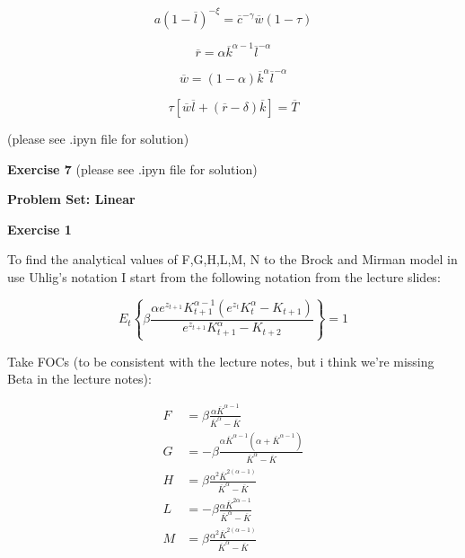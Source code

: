 \documentclass[letterpaper,12pt]{article}
\theoremstyle{definition}
\begin{document}
\begin{equation}
  a(1-\overline{l})^{-\xi}=\overline{c}^{-\gamma}\overline{w}(1-\tau)
\end{equation}

\begin{equation}
  \overline{r}=\alpha \overline{k}^{\alpha-1}\overline{l}^{-\alpha}
\end{equation}

\begin{equation}
  \overline{w}=(1-\alpha) \overline{k}^{\alpha} \overline{l}^{-\alpha}
\end{equation}

\begin{equation}
  \tau[\overline{w}\overline{l}+(\overline{r}-\delta) \overline{k}]=\overline{T}
\end{equation}

(please see .ipyn file for solution)

\vspace{5mm}

\noindent\textbf{Exercise 7}
(please see .ipyn file for solution)

 \newpage

\begin{flushleft}
  \textbf{\large{Problem Set: Linear}} \\
\end{flushleft}

\vspace{5mm}

\noindent\textbf{Exercise 1}

To find the analytical values of F,G,H,L,M, N to the Brock and Mirman model in use Uhlig’s notation I start from the following notation from the lecture slides:

\begin{equation}
  E_{t}\left\{\beta \frac{\alpha e^{z_{t+1}} K_{t+1}^{\alpha-1}\left(e^{z_{t}} K_{t}^{\alpha}-K_{t+1}\right)}{e^{z_{t+1}} K_{t+1}^{\alpha}-K_{t+2}}\right\}=1
\end{equation}

Take FOCs (to be consistent with the lecture notes, but i think we're missing Beta in the lecture notes):

\begin{equation*}
  \begin{aligned} F &=\beta\frac{\alpha \overline{K}^{\alpha-1}}{\overline{K}^{\alpha}-\overline{K}} \\ G &=-\beta\frac{\alpha \overline{K}^{\alpha-1}\left(\alpha+\overline{K}^{\alpha-1}\right)}{\overline{K}^{\alpha}-\overline{K}} \\ H &=\beta\frac{\alpha^{2} \overline{K}^{2(\alpha-1)}}{\overline{K}^{\alpha}-\overline{K}} \\ L &=-\beta\frac{\alpha \overline{K}^{2 \alpha-1}}{\overline{K}^{\alpha}-\overline{K}} \\ M &=\beta\frac{\alpha^{2} \overline{K}^{2(\alpha-1)}}{\overline{K}^{\alpha}-\overline{K}} \end{aligned}
\end{equation*}
\end{document}
